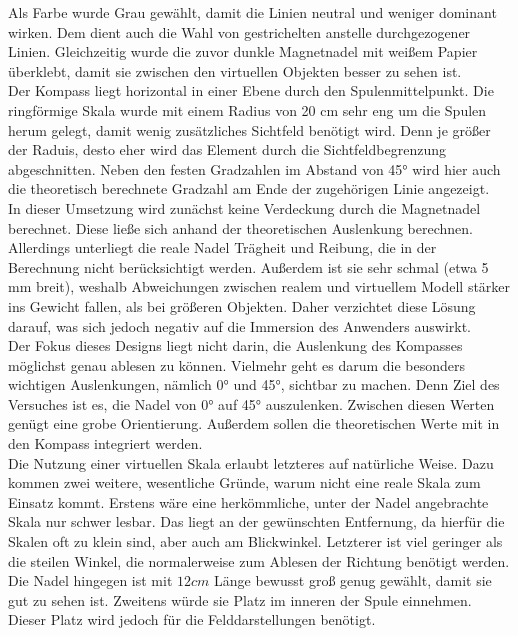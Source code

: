 Als Farbe wurde Grau gewählt, damit die Linien neutral und weniger dominant wirken. Dem dient auch die Wahl von gestrichelten anstelle durchgezogener Linien. Gleichzeitig wurde die zuvor dunkle Magnetnadel mit weißem Papier überklebt, damit sie zwischen den virtuellen Objekten besser zu sehen ist.\\

Der Kompass liegt horizontal in einer Ebene durch den Spulenmittelpunkt. Die ringförmige Skala wurde mit einem Radius von 20 cm sehr eng um die Spulen herum gelegt, damit wenig zusätzliches Sichtfeld benötigt wird. Denn je größer der Raduis, desto eher wird das Element durch die Sichtfeldbegrenzung abgeschnitten. Neben den festen Gradzahlen im Abstand von 45° wird hier auch die theoretisch berechnete Gradzahl am Ende der zugehörigen Linie angezeigt.\\

In dieser Umsetzung wird zunächst keine Verdeckung durch die Magnetnadel berechnet. Diese ließe sich anhand der theoretischen Auslenkung berechnen. Allerdings unterliegt die reale Nadel Trägheit und Reibung, die in der Berechnung nicht berücksichtigt werden. Außerdem ist sie sehr schmal (etwa 5 mm breit), weshalb Abweichungen zwischen realem und virtuellem Modell stärker ins Gewicht fallen, als bei größeren Objekten. Daher verzichtet diese Lösung darauf, was sich jedoch negativ auf die Immersion des Anwenders auswirkt.\\


Der Fokus dieses Designs liegt nicht darin, die Auslenkung des Kompasses möglichst genau ablesen zu können. Vielmehr geht es darum die besonders wichtigen Auslenkungen, nämlich 0° und 45°, sichtbar zu machen. Denn Ziel des Versuches ist es, die Nadel von 0° auf 45° auszulenken. Zwischen diesen Werten genügt eine grobe Orientierung. Außerdem sollen die theoretischen Werte mit in den Kompass integriert werden.\\

Die Nutzung einer virtuellen Skala erlaubt letzteres auf natürliche Weise. Dazu kommen zwei weitere, wesentliche Gründe, warum nicht eine reale Skala zum Einsatz kommt. Erstens wäre eine herkömmliche, unter der Nadel angebrachte Skala nur schwer lesbar. Das liegt an der gewünschten Entfernung, da hierfür die Skalen oft zu klein sind, aber auch am Blickwinkel. Letzterer ist viel geringer als die steilen Winkel, die normalerweise zum Ablesen der Richtung benötigt werden. Die Nadel hingegen ist mit $12 cm$ Länge bewusst groß genug gewählt, damit sie gut zu sehen ist. Zweitens würde sie Platz im inneren der Spule einnehmen. Dieser Platz wird jedoch für die Felddarstellungen benötigt.\\

